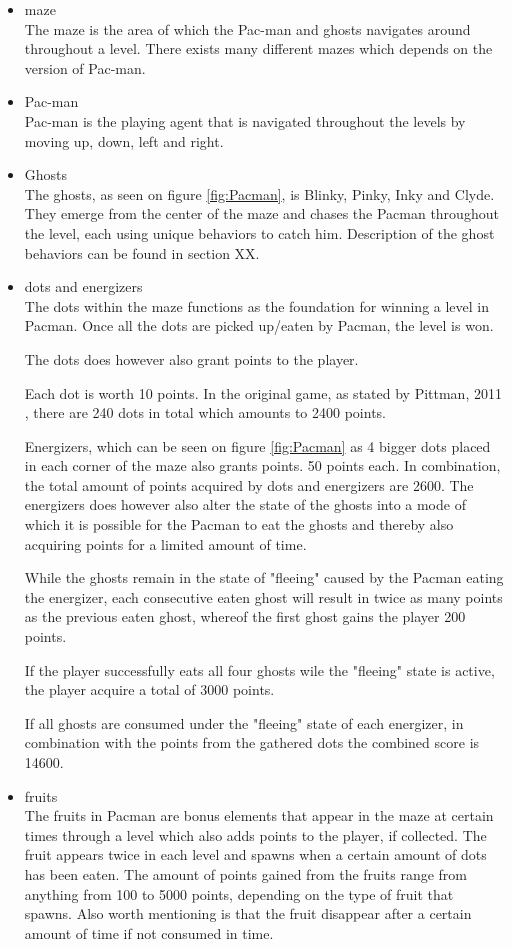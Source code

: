 \begin{itemize}
\item maze\\
The maze is the area of which the Pac-man and ghosts navigates around throughout a level. There exists many different mazes which depends on the version of Pac-man.
\item Pac-man\\
Pac-man is the playing agent that is navigated throughout the levels by moving up, down, left and right.
\item Ghosts\\
The ghosts, as seen on figure \ref{fig:Pacman}, is Blinky, Pinky, Inky and Clyde. They emerge from the center of the maze and chases the Pacman throughout the level, each using unique behaviors to catch him. Description of the ghost behaviors can be found in section XX.
\item dots and energizers\\
The dots within the maze functions as the foundation for winning a level in Pacman. Once all the dots are picked up/eaten by Pacman, the level is won.

The dots does however also grant points to the player.

Each dot is worth 10 points. In the original game, as stated by Pittman, 2011 \cite{Pittman2011}, there are 240 dots in total which amounts to 2400 points.

Energizers, which can be seen on figure \ref{fig:Pacman} as 4 bigger dots placed in each corner of the maze also grants points. 50 points each.
In combination, the total amount of points acquired by dots and energizers are  2600. The energizers does however also alter the state of the ghosts into a mode of which it is possible for the Pacman to eat the ghosts and thereby also acquiring points for a limited amount of time.

While the ghosts remain in the state of "fleeing" caused by the Pacman eating the energizer, each consecutive eaten ghost will result in twice as many points as the previous eaten ghost, whereof the first ghost gains the player 200 points.

If the player successfully eats all four ghosts wile the "fleeing" state is active, the player acquire a total of 3000 points.

If all ghosts are consumed under the "fleeing" state of each energizer, in combination with the points from the gathered dots the combined score is 14600.
\item fruits\\
The fruits in Pacman are bonus elements that appear in the maze at certain times through a level which also adds points to the player, if collected. The fruit appears twice in each level and spawns when a certain amount of dots has been eaten.
The amount of points gained from the fruits range from anything from 100 to 5000 points, depending on the type of fruit that spawns. Also worth mentioning is that the fruit disappear after a certain amount of time if not consumed in time.
\end{itemize}


